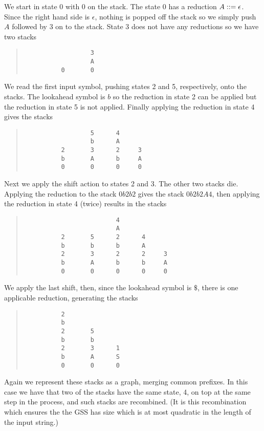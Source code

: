 We start in state 0 with 0 on the stack. The state 0 has a reduction 
$A::=\epsilon$. Since the right hand side is $\epsilon$,
nothing is popped off the stack so we simply push $A$ followed by 3
on to the stack. State 3 does not have any reductions so we have 
two stacks
\begin{quote}
\begin{verbatim}
                  3
                  A
          0       0
\end{verbatim}
\end{quote}
We read the first input symbol, pushing states 2 and 5, respectively,
onto the stacks.
The lookahead symbol is $b$ so the reduction in state 2 can be applied
but the reduction in state 5 is not applied. Finally applying the
reduction in state 4 gives the stacks
\begin{quote}
\begin{verbatim}
                  5      4
                  b      A
          2       3      2     3
          b       A      b     A
          0       0      0     0
\end{verbatim}
\end{quote}
Next we apply the shift action to states 2 and 3. The other
two stacks die. Applying the reduction to the stack $0b2b2$ gives the
stack $0b2b2A4$, then applying the reduction in state 4 (twice)
results in the stacks
\begin{quote}
\begin{verbatim}
                         4
                         A
          2       5      2      4
          b       b      b      A
          2       3      2      2     3
          b       A      b      b     A
          0       0      0      0     0
\end{verbatim}
\end{quote}
We apply the last shift, then, since the lookahead symbol is $\$$,
there is one applicable reduction, generating the stacks
\begin{quote}
\begin{verbatim}
          2              
          b              
          2       5 
          b       b  
          2       3      1 
          b       A      S  
          0       0      0
\end{verbatim}
\end{quote}

Again we represent these stacks as a graph, merging common
prefixes. In this case we have that two of the stacks have the same
state, 4, on top at the same step in the process, and such stacks are
recombined. (It is this recombination which ensures the the GSS has
size which is at most quadratic in the length of the input string.)
\begin{center}
\footnotesize

\end{center}

